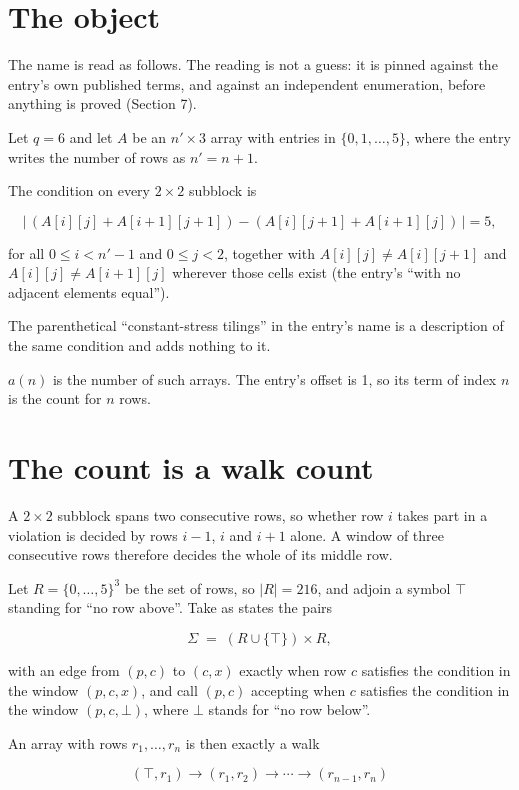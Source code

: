 \documentclass[11pt]{article}
\theoremstyle{definition}
\begin{document}
\section{The object}

The name is read as follows. The reading is not a guess: it is pinned against the entry's own published terms, and against an independent enumeration, before anything is proved (Section 7).

Let $q = 6$ and let $A$ be an $n' \times 3$ array with entries in $\{0,1,\dots,5\}$, where the entry writes the number of rows as $n' = n + 1$.

The condition on every $2 \times 2$ subblock is

\[\bigl|\,(A[i][j] + A[i{+}1][j{+}1]) - (A[i][j{+}1] + A[i{+}1][j])\,\bigr| = 5,\]

for all $0 \le i < n'-1$ and $0 \le j < 2$, together with $A[i][j] \ne A[i][j{+}1]$ and $A[i][j] \ne A[i{+}1][j]$ wherever those cells exist (the entry's ``with no adjacent elements equal'').

The parenthetical ``constant-stress tilings'' in the entry's name is a description of the same condition and adds nothing to it.

$a(n)$ is the number of such arrays. The entry's offset is 1, so its term of index $n$ is the count for $n$ rows.

\section{The count is a walk count}

A $2 \times 2$ subblock spans two consecutive rows, so whether row $i$ takes part in a violation is decided by rows $i-1$, $i$ and $i+1$ alone. A window of three consecutive rows therefore decides the whole of its middle row.

Let $R = \{0,\dots,5\}^{3}$ be the set of rows, so $|R| = 216$, and adjoin a symbol $\top$ standing for ``no row above''. Take as states the pairs

\[\Sigma \;=\; (R \cup \{\top\}) \times R,\]

with an edge from $(p,c)$ to $(c,x)$ exactly when row $c$ satisfies the condition in the window $(p,c,x)$, and call $(p,c)$ accepting when $c$ satisfies the condition in the window $(p,c,\bot)$, where $\bot$ stands for ``no row below''.

An array with rows $r_1,\dots,r_n$ is then exactly a walk

\[(\top,r_1) \to (r_1,r_2) \to \cdots \to (r_{n-1},r_n)\]
\end{document}
